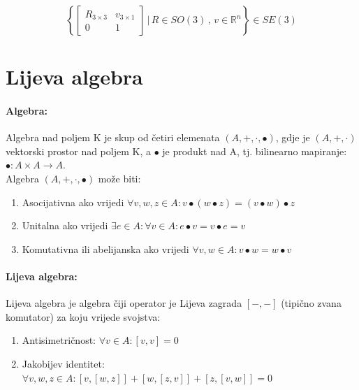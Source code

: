 \documentclass[times, utf8, diplomski]{fer}
\begin{document}
	\begin{equation}
		\left \{
		\begin{bmatrix}
		R_{3 \times 3} & v_{3 \times 1} \\
		0 & 1
		\end{bmatrix}
		\, \Biggr\rvert \, R \in SO(3) \, , \, v \in \mathbb{R}^n
		\right \} \in SE(3)
	\end{equation}	
	
\newpage
\clearpage

\section{Lijeva algebra}

	\paragraph{Algebra:} Algebra nad poljem K je skup od četiri elemenata $(A, +, \cdot, \bullet)$, gdje je $(A, +, \cdot)$ vektorski prostor nad poljem K, a $\bullet$ je produkt nad A, tj. bilinearno mapiranje: $\bullet : A \times A \rightarrow A$. \\
	Algebra $(A, +, \cdot, \bullet)$ može biti:
	\begin{enumerate}
		\item Asocijativna ako vrijedi $\forall v, w, z \in A : v \bullet (w \bullet z) = (v \bullet w) \bullet z$
		
		\item Unitalna ako vrijedi $\exists e \in A : \forall v \in A : e \bullet v = v \bullet e = v$
		
		\item Komutativna ili abelijanska ako vrijedi $\forall v, w \in A : v \bullet w = w \bullet v$
	\end{enumerate}
	
	\paragraph{Lijeva algebra:} Lijeva algebra je algebra čiji operator je Lijeva zagrada $[-,-]$ (tipično zvana komutator) za koju vrijede svojstva: 
	
	\begin{enumerate}
		
		\item Antisimetričnost: $\forall v \in A: [v, v] = 0$
		
		\item Jakobijev identitet: $\forall v, w, z \in A : [v,[w, z]] + [w,[z,v]] + [z,[v,w]] = 0$
		
	\end{enumerate} 
	
\end{document}

